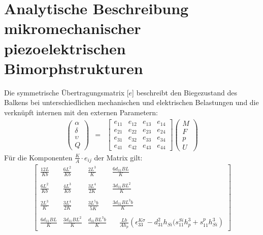 
\section[Aktoren]
{Analytische Beschreibung mikromechanischer
piezoelektrischen Bimorphstrukturen}


Die symmetrische Übertragungsmatrix [$e$] beschreibt den Biegezustand
des Balkens bei unterschiedlichen mechanischen und elektrischen
Belastungen und die verknüpft internen mit den externen Parametern:
%
\begin{eqnarray*}
  \left(
  \begin{array}{c}
  \alpha \\ \delta \\ \upsilon \\ Q
  \end{array} \right) & = &
  \left[
  \begin{array}{llll}
  e_{11} & e_{12} & e_{13} & e_{14} \\
  e_{21} & e_{22} & e_{23} & e_{24} \\
  e_{31} & e_{32} & e_{33} & e_{34} \\
  e_{41} & e_{42} & e_{43} & e_{44}
  \end{array}
 \right]
 \left(
 \begin{array}{c}
 M \\ F \\ p \\ U
 \end{array}
\right)
\end{eqnarray*}
%
Für die Komponenten $\displaystyle \frac{K}{A} \cdot e_{ij}$ der Matrix gilt:
%
\begin{eqnarray*}
\left [
\begin{array}{cccc}
\displaystyle \frac{12L}{Kb} & \displaystyle \frac{6L^{2}}{Kb} &
\displaystyle \frac{2L^{3}}{K} & \frac{6d_{31}BL}{K} \\
\\
\displaystyle \frac{6L^{2}}{Kb} & \displaystyle \frac{4L^{3}}{Kb} &
\displaystyle \frac{3L^{4}}{2K} &
               \displaystyle \frac{3d_{31}BL^{2}}{K}\\
\\
\displaystyle \frac{2L^{3}}{K} & \displaystyle \frac{3L^{4}}{2K} &
\displaystyle \frac{3L^{5}b}{5K} & \displaystyle
\frac{3d_{31}BL^{3}b}{K}\\
\\
\displaystyle \frac{6d_{31}BL}{K}     &
\displaystyle \frac{3d_{31}BL^{2}}{K} &
\displaystyle \frac{d_{31}BL^{3}b}{K} &
\quad \displaystyle \frac{Lb}{Ah_{p}} %
\left( \epsilon^{K \sigma}_{33} -
d_{31}^{2} h_{Si} (s^{Si}_{11} h_{p}^{3} +
s^{p}_{11} h_{Si}^{3}  \right)
\end{array}
\right ]
\end{eqnarray*}
